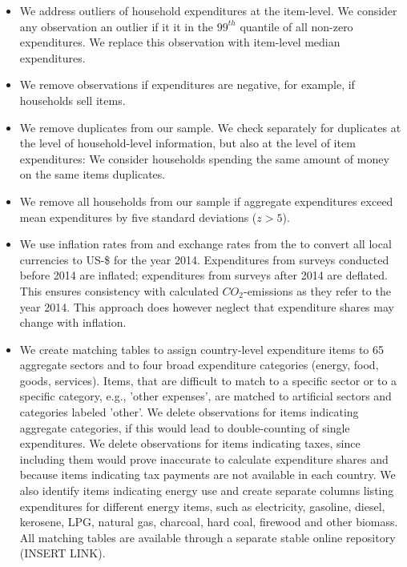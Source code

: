 \documentclass[12pt, a4paper]{article}
\begin{document}
\begin{itemize}
    \item We address outliers of household expenditures at the item-level. We consider any observation an outlier if it it in the $99^{th}$ quantile of all non-zero expenditures. We replace this observation with item-level median expenditures.
    \item We remove observations if expenditures are negative, for example, if households sell items.
    \item We remove duplicates from our sample. We check separately for duplicates at the level of household-level information, but also at the level of item expenditures: We consider households spending the same amount of money on the same items duplicates.
    \item We remove all households from our sample if aggregate expenditures exceed mean expenditures by five standard deviations ($z>5$).
    \item We use inflation rates from \textcite{IMF.2020} and exchange rates from the \textcite{WorldBankGroup.2023} to convert all local currencies to US-\$ for the year 2014. Expenditures from surveys conducted before 2014 are inflated; expenditures from surveys after 2014 are deflated. This ensures consistency with calculated $CO_{2}$-emissions as they refer to the year 2014. This approach does however neglect that expenditure shares may change with inflation.
    \item We create matching tables to assign country-level expenditure items to 65 aggregate sectors and to four broad expenditure categories (energy, food, goods, services). Items, that are difficult to match to a specific sector or to a specific category, e.g., 'other expenses', are matched to artificial sectors and categories labeled 'other'. We delete observations for items indicating aggregate categories, if this would lead to double-counting of single expenditures. We delete observations for items indicating taxes, since including them would prove inaccurate to calculate expenditure shares and because items indicating tax payments are not available in each country. We also identify items indicating energy use and create separate columns listing expenditures for different energy items, such as electricity, gasoline, diesel, kerosene, LPG, natural gas, charcoal, hard coal, firewood and other biomass. All matching tables are available through a separate stable online repository (INSERT LINK).
\end{itemize}
\end{document}

